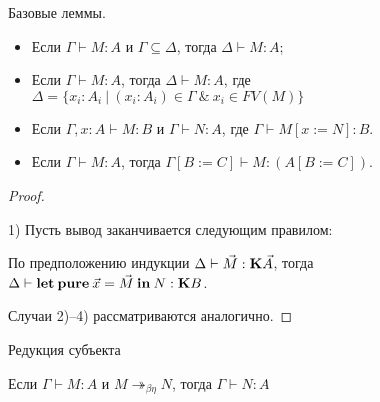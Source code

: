 \begin{lemma} Базовые леммы.

\begin{itemize}
\item Если $\Gamma \vdash M : A$ и $\Gamma \subseteq \Delta$, тогда $\Delta \vdash M : A$;
\item Если $\Gamma \vdash M : A$, тогда $\Delta \vdash M : A$, где $\Delta = \{ x_i : A_i \: | \: (x_i : A_i) \in \Gamma \: \& \: x_i \in FV(M) \}$
\item Если $\Gamma, x : A \vdash M : B$ и $\Gamma \vdash N : A$, где $\Gamma \vdash M [x := N] : B$.
\item Если $\Gamma \vdash M : A$, тогда $\Gamma [B := C] \vdash M : (A [B := C])$.
\end{itemize}
\end{lemma}

\begin{proof}
$ $

1) Пусть вывод заканчивается следующим правилом:

\begin{prooftree}
\end{prooftree}

По предположению индукции $\Delta \vdash \vec{M} : {\bf K} \vec{A}$, тогда $\Delta \vdash {\bf let \: pure \:} \vec{x} = \vec{M} {\: \bf in \: } N : {\bf K}B$.

\vspace{\baselineskip}

Случаи 2)--4) рассматриваются аналогично.
\end{proof}

\begin{theorem} Редукция субъекта

Если $\Gamma \vdash M : A$ и $M \twoheadrightarrow_{\beta \eta} N$, тогда $\Gamma \vdash N : A$

\end{theorem}

